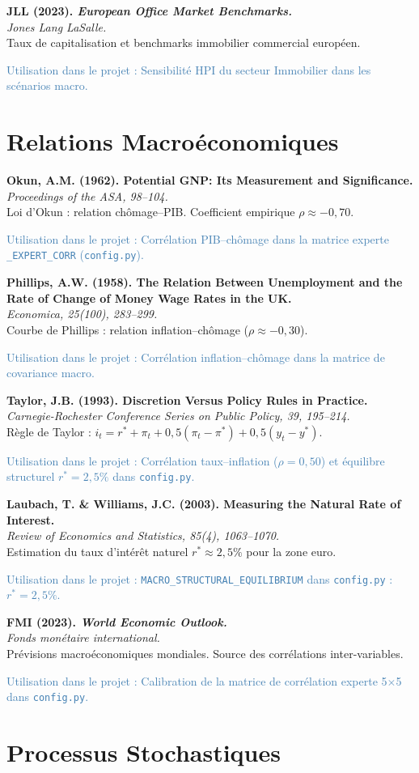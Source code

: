 \documentclass[12pt,a4paper]{article}
\newcommand{\bibentry}[4]{%
  \noindent\textbf{#1}\\
  \textit{#2}\\
  #3\par
  \textcolor{steelblue}{\footnotesize\textsf{Utilisation dans le projet :} #4}\par
  \medskip
}
\begin{document}
\bibentry{JLL (2023). \emph{European Office Market Benchmarks.}}{Jones Lang LaSalle.}{Taux de capitalisation et benchmarks immobilier commercial européen.}{Sensibilité HPI du secteur Immobilier dans les scénarios macro.}

\section{Relations Macroéconomiques}

\bibentry{Okun, A.M. (1962). Potential GNP: Its Measurement and Significance.}{\emph{Proceedings of the ASA}, 98--104.}{Loi d'Okun : relation chômage--PIB. Coefficient empirique $\rho \approx -0{,}70$.}{Corrélation PIB--chômage dans la matrice experte \texttt{\_EXPERT\_CORR} (\texttt{config.py}).}

\bibentry{Phillips, A.W. (1958). The Relation Between Unemployment and the Rate of Change of Money Wage Rates in the UK.}{\emph{Economica}, 25(100), 283--299.}{Courbe de Phillips : relation inflation--chômage ($\rho \approx -0{,}30$).}{Corrélation inflation--chômage dans la matrice de covariance macro.}

\bibentry{Taylor, J.B. (1993). Discretion Versus Policy Rules in Practice.}{\emph{Carnegie-Rochester Conference Series on Public Policy}, 39, 195--214.}{Règle de Taylor : $i_t = r^* + \pi_t + 0{,}5(\pi_t - \pi^*) + 0{,}5(y_t - y^*)$.}{Corrélation taux--inflation ($\rho = 0{,}50$) et équilibre structurel $r^* = 2{,}5\%$ dans \texttt{config.py}.}

\bibentry{Laubach, T. \& Williams, J.C. (2003). Measuring the Natural Rate of Interest.}{\emph{Review of Economics and Statistics}, 85(4), 1063--1070.}{Estimation du taux d'intérêt naturel $r^* \approx 2{,}5\%$ pour la zone euro.}{\texttt{MACRO\_STRUCTURAL\_EQUILIBRIUM} dans \texttt{config.py} : $r^* = 2{,}5\%$.}

\bibentry{FMI (2023). \emph{World Economic Outlook.}}{Fonds monétaire international.}{Prévisions macroéconomiques mondiales. Source des corrélations inter-variables.}{Calibration de la matrice de corrélation experte 5$\times$5 dans \texttt{config.py}.}

\section{Processus Stochastiques}
\end{document}
